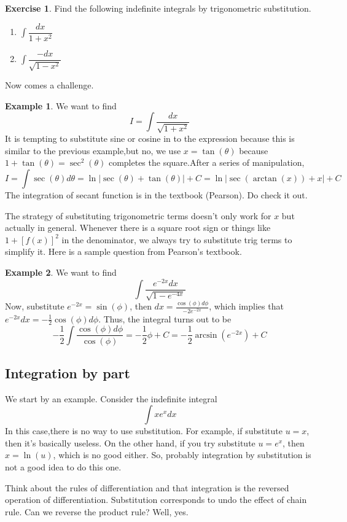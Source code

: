\documentclass{article}
\theoremstyle{definition}
\theoremstyle{definition}
\theoremstyle{definition}
\theoremstyle{definition}
\theoremstyle{definition}
\theoremstyle{definition}
\newtheorem{example}{Example}
\theoremstyle{definition}
\theoremstyle{definition}
\theoremstyle{definition}
\newtheorem{exercise}{Exercise}
\begin{document}
\begin{exercise}
Find the following indefinite integrals by trigonometric substitution.
\begin{enumerate}
	\item $\int \dfrac{dx}{1+x^2}$
	\item $\int \dfrac{-dx}{\sqrt{1-x^2}}$
\end{enumerate}
\end{exercise}

Now comes a challenge.
\begin{example}
We want to find \[I=\int \dfrac{dx}{\sqrt{1+x^2}}\]
It is tempting to substitute sine or cosine in to the expression because this is similar to the previous example,but no, we use $x=\tan(\theta)$ because $1+\tan(\theta)=\sec^2(\theta)$ completes the square.After a series of manipulation,
\[
I=\int\sec(\theta)d\theta=\ln|\sec(\theta)+\tan(\theta)|+C=\ln|\sec(\arctan(x))+x|+C
\]
The integration of secant function is in the textbook (Pearson). Do check it out.
\end{example}

The strategy of substituting trigonometric terms doesn't only work for $x$ but actually in general. Whenever there is a square root sign or things like $1+[f(x)]^2$ in the denominator, we always try to substitute trig terms to simplify it. Here is a sample question from Pearson's textbook.
\begin{example}
We want to find \[ \int \dfrac{e^{-2x}dx}{\sqrt{1-e^{-4x}}}\]
Now, substitute $e^{-2x}=\sin(\phi)$, then $dx=\frac{\cos(\phi)d\phi}{-2e^{-2x}}$, which implies that $e^{-2x}dx=-\frac{1}{2}\cos(\phi)d\phi$. Thus, the integral turns out to be
\[
-\dfrac{1}{2}\int\dfrac{\cos(\phi)d\phi}{\cos(\phi)}=-\dfrac{1}{2}\phi+C=-\dfrac{1}{2}\arcsin(e^{-2x})+C
\]
\end{example}

\subsection{Integration by part}
We start by an example. Consider the indefinite integral
\[
\int xe^xdx
\]
In this case,there is no way to use substitution. For example, if substitute $u=x$, then it's basically useless. On the other hand, if you try substitute $u=e^x$, then $x=\ln(u)$, which is no good either. So, probably integration by substitution is not a good idea to do this one.

Think about the rules of differentiation and that integration is the reversed operation of differentiation. Substitution corresponds to undo the effect of chain rule. Can we reverse the product rule? Well, yes.
\end{document}
